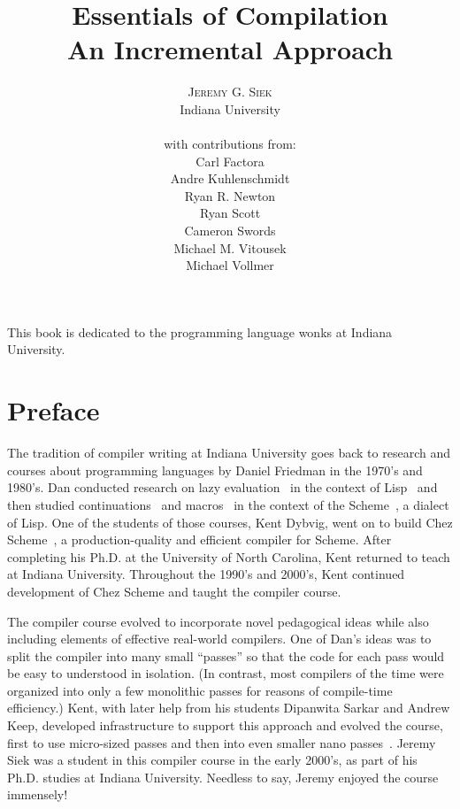 \documentclass[11pt]{book}
\title{\Huge \textbf{Essentials of Compilation} \\
  \huge An Incremental Approach}
\author{\textsc{Jeremy G. Siek} \\
  Indiana University \\
  \\
  with contributions from: \\
  Carl Factora \\
  Andre Kuhlenschmidt \\
  Ryan R. Newton \\
  Ryan Scott \\
  Cameron Swords \\
  Michael M. Vitousek \\
  Michael Vollmer 
   }
\newenvironment{dedication}
{
   \cleardoublepage
   \thispagestyle{empty}
   \vspace*{\stretch{1}}
   \hfill\begin{minipage}[t]{0.66\textwidth}
   \raggedright
}
{
   \end{minipage}
   \vspace*{\stretch{3}}
   \clearpage
}
\begin{document}
\frontmatter
\maketitle

\begin{dedication}
This book is dedicated to the programming language wonks at Indiana
University.
\end{dedication}

\tableofcontents
\listoffigures

\mainmatter

\chapter*{Preface}

The tradition of compiler writing at Indiana University goes back to
research and courses about programming languages by Daniel Friedman in
the 1970's and 1980's. Dan conducted research on lazy
evaluation~\citep{Friedman:1976aa} in the context of
Lisp~\citep{McCarthy:1960dz} and then studied
continuations~\citep{Felleisen:kx} and
macros~\citep{Kohlbecker:1986dk} in the context of the
Scheme~\citep{Sussman:1975ab}, a dialect of Lisp.  One of the students
of those courses, Kent Dybvig, went on to build Chez
Scheme~\citep{Dybvig:2006aa}, a production-quality and efficient
compiler for Scheme. After completing his Ph.D. at the University of
North Carolina, Kent returned to teach at Indiana University.
Throughout the 1990's and 2000's, Kent continued development of Chez
Scheme and taught the compiler course.

The compiler course evolved to incorporate novel pedagogical ideas
while also including elements of effective real-world compilers.  One
of Dan's ideas was to split the compiler into many small ``passes'' so
that the code for each pass would be easy to understood in isolation.
(In contrast, most compilers of the time were organized into only a
few monolithic passes for reasons of compile-time efficiency.)  Kent,
with later help from his students Dipanwita Sarkar and Andrew Keep,
developed infrastructure to support this approach and evolved the
course, first to use micro-sized passes and then into even smaller
nano passes~\citep{Sarkar:2004fk,Keep:2012aa}. Jeremy Siek was a
student in this compiler course in the early 2000's, as part of his
Ph.D. studies at Indiana University. Needless to say, Jeremy enjoyed
the course immensely!
\end{document}
